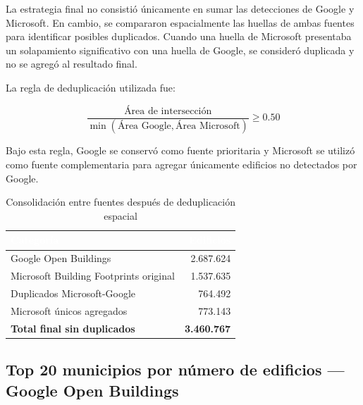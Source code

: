 \documentclass{article}
\newcommand{\tblhdr}[1]{%
  \cellcolor{azulclaro}\textbf{\textcolor{white}{#1}}%
}
\begin{document}
La estrategia final no consistió únicamente en sumar las detecciones de Google y Microsoft. En cambio, se compararon espacialmente las huellas de ambas fuentes para identificar posibles duplicados. Cuando una huella de Microsoft presentaba un solapamiento significativo con una huella de Google, se consideró duplicada y no se agregó al resultado final.

La regla de deduplicación utilizada fue:

\[
\frac{\text{Área de intersección}}{\min(\text{Área Google}, \text{Área Microsoft})} \geq 0.50
\]

Bajo esta regla, Google se conservó como fuente prioritaria y Microsoft se utilizó como fuente complementaria para agregar únicamente edificios no detectados por Google.

\begin{table}[H]
\centering
\caption{Consolidación entre fuentes después de deduplicación espacial}
\begin{tabular}{p{8cm} r}
\toprule
\tblhdr{Categoría} & \tblhdr{Edificios} \\
\midrule
Google Open Buildings & 2.687.624 \\
\rowcolor{grisfilas}
Microsoft Building Footprints original & 1.537.635 \\
Duplicados Microsoft-Google & 764.492 \\
\rowcolor{grisfilas}
Microsoft únicos agregados & 773.143 \\
\textbf{Total final sin duplicados} & \textbf{3.460.767} \\
\bottomrule
\end{tabular}
\end{table}

\subsection{Top 20 municipios por número de edificios — Google Open Buildings}
\end{document}
